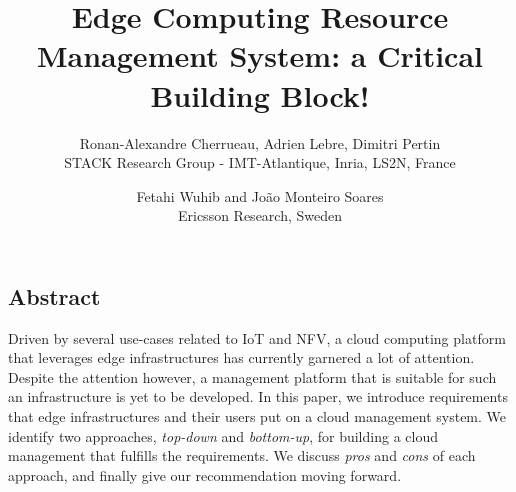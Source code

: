 \documentclass[letterpaper,twocolumn,10pt]{article}
\begin{document}
\date{}

\title{\Large Edge Computing Resource Management System: a Critical Building Block!}

\author{
{\rm Ronan-Alexandre Cherrueau, Adrien Lebre, Dimitri Pertin}\\
STACK Research Group - IMT-Atlantique, Inria, LS2N, France
\and
{\rm Fetahi Wuhib and  João Monteiro Soares}\\
Ericsson Research, Sweden\\
} %

\maketitle

\thispagestyle{empty}


\subsection*{Abstract}
Driven by several use-cases related to IoT and NFV, a cloud computing platform that leverages edge infrastructures has currently garnered a lot of attention. Despite the attention however, a management platform that is suitable for such an infrastructure is yet to be developed. In this paper, we introduce requirements that edge infrastructures and their users put on a cloud management system. We identify two approaches, \emph{top-down} and \emph{bottom-up}, for building a cloud management that fulfills the requirements. We discuss \emph{pros} and \emph{cons} of each approach, and finally give our recommendation moving forward.         




% 
% 




{\footnotesize 
}

\theendnotes
\end{document}
